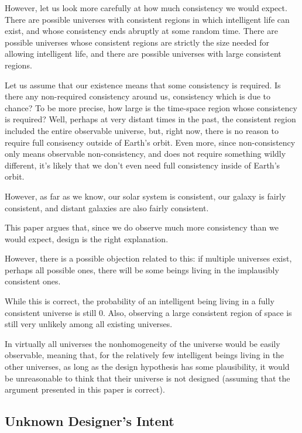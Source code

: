 \documentclass[a4paper
,draft
]{article}
\newcommand{\paper}[1]{paper}
\begin{document}
However, let us look more carefully at how much consistency we would expect.
There are possible universes with consistent regions in which
intelligent life can exist, and whose consistency ends abruptly at some
random time. There are possible universes whose consistent regions are
strictly the size needed for allowing intelligent life, and there are possible
universes with large consistent regions.

Let us assume that our existence means that some consistency is required.
Is there any non-required consistency around us, consistency which is due to
chance? To be more precise,
how large is the time-space region whose consistency is required? Well,
perhaps at very distant times in the past, the consistent region included
the entire observable universe, but, right now, there is no reason to require
full consisency outside of Earth's orbit. Even more, since non-consistency
only means
observable non-consistency, and does not require something wildly different,
it's likely that we don't even need full consistency inside of Earth's orbit.

However, as far as we know, our solar system is consistent, our galaxy is
fairly consistent, and distant galaxies are also fairly consistent.

This \paper{} argues that, since we do observe much more consistency
than we would expect, design is the right explanation.

However, there is a possible objection related to this: if multiple universes
exist, perhaps all possible ones, there will be some beings living in the
implausibly consistent ones.

While this is correct, the probability of an intelligent being
living in a fully consistent universe is still $0$.
Also, observing a large consistent region of space is still very unlikely among
all existing universes.

In virtually all universes the nonhomogeneity of the universe would be
easily observable, meaning that, for the relatively few intelligent beings
living in the other universes, as long as the design hypothesis
has some plausibility, it would be unreasonable to think that
their universe is not designed (assuming that the argument presented in
this \paper{} is correct).

\subsection{Unknown Designer's Intent}
\end{document}
